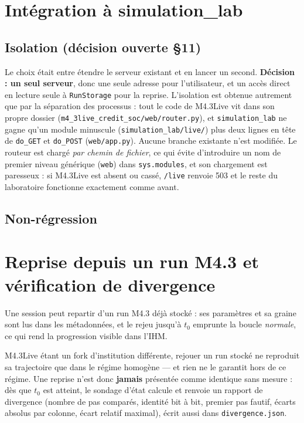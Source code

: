 \documentclass[11pt,a4paper]{article}
\newcommand{\code}[1]{\texttt{#1}}
\begin{document}
\section{Intégration à simulation\_lab}

\subsection{Isolation (décision ouverte §11)}

Le choix était entre étendre le serveur existant et en lancer un second.
\textbf{Décision : un seul serveur}, donc une seule adresse pour
l'utilisateur, et un accès direct en lecture seule à
\code{RunStorage} pour la reprise. L'isolation est obtenue autrement que
par la séparation des processus : tout le code de M4.3Live vit dans son
propre dossier (\code{m4\_3live\_credit\_soc/web/router.py}), et
\code{simulation\_lab} ne gagne qu'un module minuscule
(\code{simulation\_lab/live/}) plus deux lignes en tête de \code{do\_GET} et
\code{do\_POST} (\code{web/app.py}). Aucune branche existante n'est
modifiée. Le routeur est chargé \emph{par chemin de fichier}, ce qui évite
d'introduire un nom de premier niveau générique (\code{web}) dans
\code{sys.modules}, et son chargement est paresseux : si M4.3Live est
absent ou cassé, \code{/live} renvoie 503 et le reste du laboratoire
fonctionne exactement comme avant.

\subsection{Non-régression}



\section{Reprise depuis un run M4.3 et vérification de divergence}

Une session peut repartir d'un run M4.3 déjà stocké : ses paramètres et sa
graine sont lus dans les métadonnées, et le rejeu jusqu'à $t_0$ emprunte la
boucle \emph{normale}, ce qui rend la progression visible dans l'IHM.

M4.3Live étant un fork d'institution différente, rejouer un run stocké ne
reproduit sa trajectoire que dans le régime homogène --- et rien ne le
garantit hors de ce régime. Une reprise n'est donc \textbf{jamais}
présentée comme identique sans mesure : dès que $t_0$ est atteint, le
sondage d'état calcule et renvoie un rapport de divergence (nombre de pas
comparés, identité bit à bit, premier pas fautif, écarts absolus par
colonne, écart relatif maximal), écrit aussi dans
\code{divergence.json}.
\end{document}
